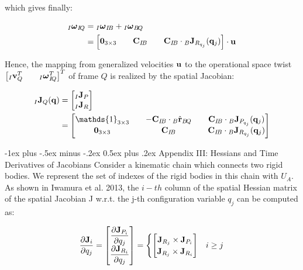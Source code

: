 \documentclass[10pt,landscape,a4paper]{article}
\makeatletter
\renewcommand{\section}{\@startsection{section}{1}{0mm}%
                               {-1ex plus -.5ex minus -.2ex}%
                                {0.5ex plus .2ex}%
                                {\normalfont\large\bfseries}}
\newcommand\identity{\mathds{1}}
\newcommand\poshat[3]{{}_#1\hat{\vr}_{#2\!#3}}
\newcommand\comat[2]{\vC_{#1\!#2}}
\newcommand\rotvel[3]{{}_#1\vom_{#2\!#3}}
\makeatother
\begin{document}
\begin{multicols}{2}
which gives finally:

\begin{equation}
\begin{aligned}
\rotvel{I}{I}{Q}
&= \rotvel{I}{I}{B} + \rotvel{I}{B}{Q} \\
&= 
\begin{bmatrix}
\mathbf{0}_{3 \times 3} && \comat{I}{B} && \comat{I}{B} \cdot {}_B \vJ_{R_{q_j}}(\vq_j)
\end{bmatrix}
\cdot \vu
\end{aligned}
\end{equation}

Hence, the mapping from generalized velocities $\mathbf u$ to the operational space twist $\begin{bmatrix}{}_I \vv_{Q}^T && \rotvel{I}{I}{Q}^T \end{bmatrix}^T$ of frame $Q$ is realized by the spatial Jacobian:

\begin{equation}
\begin{aligned}
{}_I \vJ_Q(\vq)
&=
\begin{bmatrix}
{}_I \vJ_P \\
{}_I \vJ_R
\end{bmatrix} \\
&=
\begin{bmatrix}
\identity_{3\times 3} && -\comat{I}{B} \cdot \poshat{B}{B}{Q} && \comat{I}{B} \cdot {}_B \vJ_{P_{q_j}}(\vq_j) \\
\mathbf{0}_{3 \times 3} && \comat{I}{B} && \comat{I}{B} \cdot {}_B \vJ_{R_{q_j}}(\vq_j)
\end{bmatrix}
\end{aligned}
\end{equation}

\section{Appendix III: Hessians and Time Derivatives of Jacobians}
Consider a kinematic chain which connects two rigid bodies. We represent the set of indexes of the rigid bodies in this chain with $U_A$. As shown in Iwamura et al. 2013, the $i-th$ column of the spatial Hessian matrix of the spatial Jacobian J w.r.t. the j-th configuration variable $q_j$ can be computed as:

\begin{equation}
\dfrac{\partial \mathbf J_i}{\partial q_j}
= \begin{bmatrix}
\dfrac{\partial \mathbf J_{P_i}}{\partial q_j} \\ \dfrac{\partial \mathbf J_{R_i}}{\partial q_j}
\end{bmatrix}
=
\begin{cases}
\begin{bmatrix}
\mathbf J_{R_j} \times \mathbf J_{P_i}\\ 
\mathbf J_{R_j} \times \mathbf J_{R_i}
\end{bmatrix} & i \ge j \\


\end{cases}
\end{equation}
\end{multicols}
\end{document}
